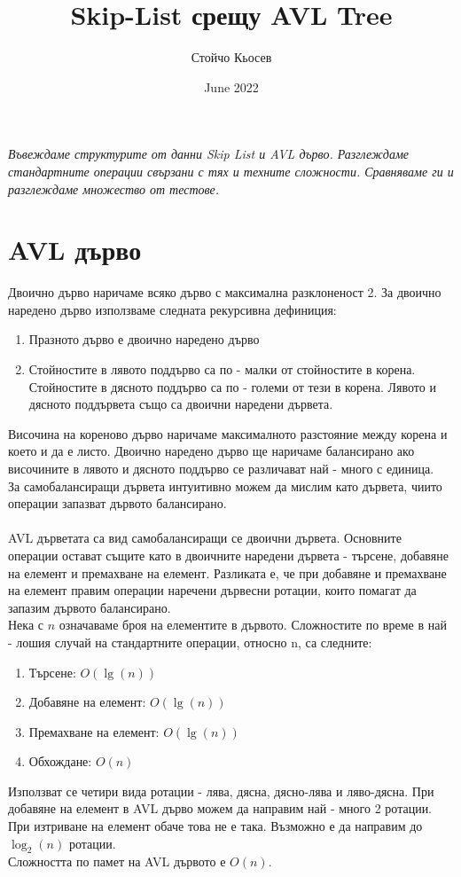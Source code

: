 \documentclass[a4paper,12pt,fleqn]{article}
\title{Skip-List срещу AVL Tree}
\author{Стойчо Кьосев}
\date{June 2022}
\begin{document}
	\maketitle
	\textit{Въвеждаме структурите от данни Skip List и AVL дърво. Разглеждаме стандартните операции свързани с тях и техните сложности. Сравняваме ги и разглеждаме множество от тестове.}
	
	\section{AVL дърво}
	Двоично дърво наричаме всяко дърво с максимална разклоненост 2.
	За двоично наредено дърво използваме следната рекурсивна дефиниция:
	\begin{enumerate}
		\item Празното дърво е двоично наредено дърво
		\item Стойностите в лявото поддърво са по - малки от стойностите в корена. Стойностите в дясното поддърво са по - големи от тези в корена. Лявото и дясното поддървета също са двоични наредени дървета.
	\end{enumerate}
	Височина на кореново дърво наричаме максималното разстояние между корена и което и да е листо.
	Двоично наредено дърво ще наричаме балансирано ако височините в лявото и дясното поддърво се различават най - много с единица.\\
	За самобалансиращи дървета интуитивно можем да мислим като дървета, чиито операции запазват дървото балансирано.\\
	\\AVL дърветата са вид самобалансиращи се двоични дървета. Основните операции остават същите като в двоичните наредени дървета - търсене, добавяне на елемент и премахване на елемент. Разликата е, че при добавяне и премахване на елемент правим операции наречени дървесни ротации, които помагат да запазим дървото балансирано. 
	\\Нека с $n$ означаваме броя на елементите в дървото. Сложностите по време в най - лошия случай на стандартните операции, относно n, са следните:
	\begin{enumerate}
		\item Търсене: $O(\lg(n))$
		\item Добавяне на елемент: $O(\lg(n))$
		\item Премахване на елемент: $O(\lg(n))$
		\item Обхождане: $O(n)$
	\end{enumerate}
	Използват се четири вида ротации - лява, дясна, дясно-лява и ляво-дясна. При добавяне на елемент в AVL дърво можем да направим най - много 2 ротации. При изтриване на елемент обаче това не е така. Възможно е да направим до $\log_2(n)$ ротации.\\
	Сложността по памет на AVL дървото е $O(n)$.
\end{document}
